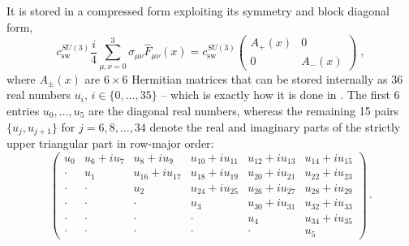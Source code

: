 It is stored in a compressed form exploiting its symmetry and block diagonal form,
\begin{equation}
c_\mathrm{sw}^{SU(3)} \frac{i}{4} \sum_{\mu,\nu=0}^3 \sigma_{\mu \nu} \hat{F}_{\mu \nu}(x) =
c_\mathrm{sw}^{SU(3)} \begin{pmatrix}
   A_{+}(x) & 0 \\
   0        & A_{-}(x)
\end{pmatrix} \;,
\end{equation}
where $A_{\pm}(x)$ are $6 \times 6$ Hermitian matrices that can be stored internally as \num{36} real numbers $u_i$, $i \in \{0, \ldots, 35\}$ -- which is exactly how it is done in \openqxd.
The first \num{6} entries $u_0, \ldots, u_5$ are the diagonal real numbers, whereas the remaining \num{15} pairs $\{u_j, u_{j+1}\}$ for $j=6,8,\ldots,34$ denote the real and imaginary parts of the strictly upper triangular part in row-major order:
\begin{equation} \label{eq:openqxd:clover}
\begin{pmatrix}
u_0   & u_6 + iu_7 & u_8 + iu_9       & u_{10} + iu_{11} & u_{12} + iu_{13} & u_{14} + iu_{15} \\
\cdot & u_1        & u_{16} + iu_{17} & u_{18} + iu_{19} & u_{20} + iu_{21} & u_{22} + iu_{23} \\
\cdot & \cdot      & u_2              & u_{24} + iu_{25} & u_{26} + iu_{27} & u_{28} + iu_{29} \\
\cdot & \cdot      & \cdot            & u_3              & u_{30} + iu_{31} & u_{32} + iu_{33} \\
\cdot & \cdot      & \cdot            & \cdot            & u_4              & u_{34} + iu_{35} \\
\cdot & \cdot      & \cdot            & \cdot            & \cdot            & u_5
\end{pmatrix}\,.
\end{equation}

